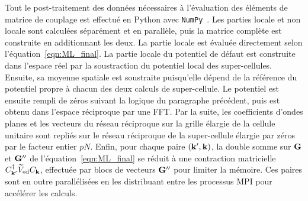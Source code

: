 
Tout le post-traitement des données nécessaires à l'évaluation des éléments de matrice de couplage est effectué en Python avec \texttt{NumPy}~\cite{ArrayProgrammingNumPy}. Les parties locale et non locale sont calculées séparément et en parallèle, puis la matrice complète est construite en additionnant les deux. La partie locale est évaluée directement selon l'équation~\eqref{eqn:ML_final}. La partie locale du potentiel de défaut est construite dans l'espace réel par la soustraction du potentiel local des super-cellules. Ensuite, sa moyenne spatiale est soustraite puisqu'elle dépend de la référence du potentiel propre à chacun des deux calculs de super-cellule. Le potentiel est ensuite rempli de zéros suivant la logique du paragraphe précédent, puis est obtenu dans l'espace réciproque par une FFT. Par la suite, les coefficients d'ondes planes et les vecteurs du réseau réciproque sur la grille élargie de la cellule unitaire sont repliés sur le réseau réciproque de la super-cellule élargie par zéros par le facteur entier $pN$. Enfin, pour chaque paire $(\mathbf{k}',\mathbf{k})$, la double somme sur $\mathbf{G}$ et $\mathbf{G}''$ de l'équation~\eqref{eqn:ML_final} se réduit à une contraction matricielle $C^\dag_{\mathbf{k}'}\widetilde{V}_\text{ed}C_{\mathbf{k}}$, effectuée par blocs de vecteurs $\mathbf{G}''$ pour limiter la mémoire. Ces paires sont en outre parallélisées en les distribuant entre les processus MPI pour accélérer les calculs.


